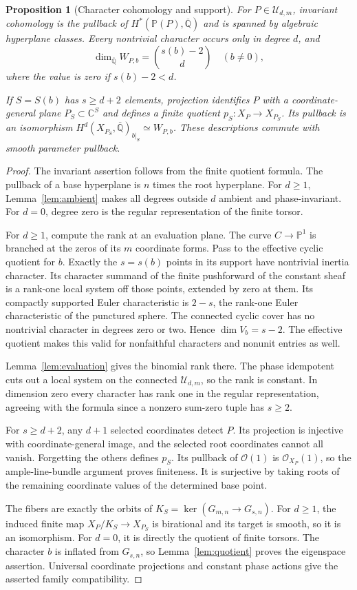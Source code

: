 \documentclass[11pt]{article}
\newcommand{\Q}{\mathbb Q}
\newcommand{\C}{\mathbb C}
\newcommand{\PP}{\mathbb P}
\newcommand{\kk}{\overline{\Q}}
\newcommand{\U}{\mathcal U}
\theoremstyle{plain}
\newtheorem{proposition}[theorem]{Proposition}
\theoremstyle{definition}
\theoremstyle{remark}
\numberwithin{equation}{section}
\begin{document}
\begin{proposition}[Character cohomology and support]\label{prop:characters}
For \(P\in\U_{d,m}\), invariant cohomology is the pullback of
\(H^*(\PP(P),\kk)\) and is spanned by algebraic hyperplane
classes.  Every nontrivial character occurs only in degree \(d\),
and
\[
 \dim_{\kk} W_{P,b}=\binom{s(b)-2}{d}\quad(b\ne0),
\]
where the value is zero if \(s(b)-2<d\).

If \(S=S(b)\) has \(s\geq d+2\) elements, projection identifies
\(P\) with a coordinate-general plane \(P_S\subset\C^S\)
and defines a finite quotient \(p_S:X_P\to X_{P_S}\).
Its pullback is an isomorphism
\(H^d(X_{P_S},\kk)_{b|_S}\simeq W_{P,b}\).
These descriptions commute with smooth parameter pullback.
\end{proposition}
\begin{proof}
The invariant assertion follows from the finite quotient formula.
The pullback of a base hyperplane is \(n\) times the root
hyperplane.  For \(d\geq1\), Lemma~\ref{lem:ambient} makes all
degrees outside \(d\) ambient and phase-invariant.  For \(d=0\),
degree zero is the regular representation of the finite torsor.

For \(d\geq1\), compute the rank at an evaluation plane.  The
curve \(C\to\PP^1\) is branched at the zeros of its \(m\)
coordinate forms.  Pass to the effective cyclic quotient for
\(b\).  Exactly the \(s=s(b)\) points in its support have
nontrivial inertia character.  Its character summand of the
finite pushforward of the constant sheaf is a rank-one local
system off those points, extended by zero at them.  Its
compactly supported Euler characteristic is \(2-s\), the
rank-one Euler characteristic of the punctured sphere.
The connected cyclic cover has no nontrivial character in
degrees zero or two.  Hence \(\dim V_b=s-2\).  The effective
quotient makes this valid for nonfaithful characters and
nonunit entries as well.

Lemma~\ref{lem:evaluation} gives the binomial rank there.  The
phase idempotent cuts out a local system on the connected
\(\U_{d,m}\), so the rank is constant.  In dimension zero every
character has rank one in the regular representation, agreeing
with the formula since a nonzero sum-zero tuple has \(s\geq2\).

For \(s\geq d+2\), any \(d+1\) selected coordinates detect \(P\).
Its projection is injective with coordinate-general image, and
the selected root coordinates cannot all vanish.  Forgetting
the others defines \(p_S\).  Its pullback of \(\mathcal O(1)\)
is \(\mathcal O_{X_P}(1)\), so the ample-line-bundle argument
proves finiteness.  It is surjective by taking roots of the
remaining coordinate values of the determined base point.

The fibers are exactly the orbits of
\(K_S=\ker(G_{m,n}\to G_{s,n})\).  For \(d\geq1\), the induced
finite map \(X_P/K_S\to X_{P_S}\) is birational and its target
is smooth, so it is an isomorphism.  For \(d=0\), it is directly
the quotient of finite torsors.  The character \(b\) is inflated
from \(G_{s,n}\), so Lemma~\ref{lem:quotient} proves the
eigenspace assertion.  Universal coordinate projections and
constant phase actions give the asserted family compatibility.
\end{proof}
\end{document}
